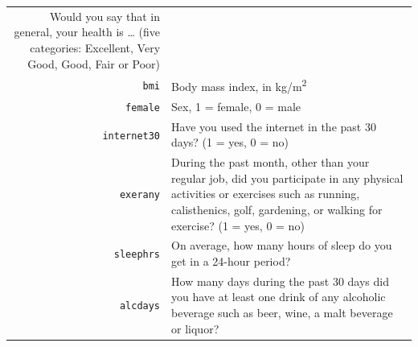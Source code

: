 \documentclass[]{book}
\theoremstyle{definition}
\theoremstyle{definition}
\theoremstyle{definition}
\theoremstyle{remark}
\begin{document}
\begin{longtable}[]{@{}rl@{}}
\begin{minipage}[t]{0.74\columnwidth}
Would you say that in general, your health is \ldots{} (five categories:
Excellent, Very Good, Good, Fair or Poor)\strut
\end{minipage}\tabularnewline
\begin{minipage}[t]{0.14\columnwidth}\raggedleft\strut
\texttt{bmi}\strut
\end{minipage} & \begin{minipage}[t]{0.74\columnwidth}\raggedright\strut
Body mass index, in kg/m\textsuperscript{2}\strut
\end{minipage}\tabularnewline
\begin{minipage}[t]{0.14\columnwidth}\raggedleft\strut
\texttt{female}\strut
\end{minipage} & \begin{minipage}[t]{0.74\columnwidth}\raggedright\strut
Sex, 1 = female, 0 = male\strut
\end{minipage}\tabularnewline
\begin{minipage}[t]{0.14\columnwidth}\raggedleft\strut
\texttt{internet30}\strut
\end{minipage} & \begin{minipage}[t]{0.74\columnwidth}\raggedright\strut
Have you used the internet in the past 30 days? (1 = yes, 0 = no)\strut
\end{minipage}\tabularnewline
\begin{minipage}[t]{0.14\columnwidth}\raggedleft\strut
\texttt{exerany}\strut
\end{minipage} & \begin{minipage}[t]{0.74\columnwidth}\raggedright\strut
During the past month, other than your regular job, did you participate
in any physical activities or exercises such as running, calisthenics,
golf, gardening, or walking for exercise? (1 = yes, 0 = no)\strut
\end{minipage}\tabularnewline
\begin{minipage}[t]{0.14\columnwidth}\raggedleft\strut
\texttt{sleephrs}\strut
\end{minipage} & \begin{minipage}[t]{0.74\columnwidth}\raggedright\strut
On average, how many hours of sleep do you get in a 24-hour
period?\strut
\end{minipage}\tabularnewline
\begin{minipage}[t]{0.14\columnwidth}\raggedleft\strut
\texttt{alcdays}\strut
\end{minipage} & \begin{minipage}[t]{0.74\columnwidth}\raggedright\strut
How many days during the past 30 days did you have at least one drink of
any alcoholic beverage such as beer, wine, a malt beverage or
liquor?\strut
\end{minipage}\tabularnewline
\bottomrule
\end{longtable}
\end{document}
